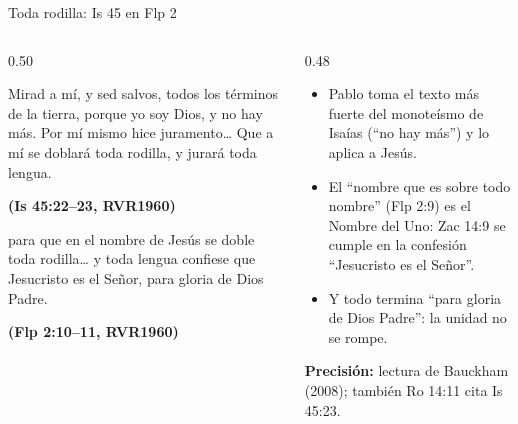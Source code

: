 \documentclass[hyperref={bookmarks=false},aspectratio=169]{beamer}
\newcommand{\fuente}[1]{\par\hfill{\upshape\bfseries\footnotesize\textcolor{azul}{#1}}}
\newcommand{\precision}[1]{{\footnotesize\color{gris}\textbf{Precisión:} #1}}
\begin{document}
\begin{frame}{Toda rodilla: Is 45 en Flp 2}
\begin{columns}[t,onlytextwidth]
\begin{column}{0.50\textwidth}
\begin{cita}[fontupper=\scriptsize\itshape]Mirad a mí, y sed salvos, todos los términos de la tierra, porque yo soy Dios, y no hay más. Por mí mismo hice juramento\ldots{} Que a mí se doblará toda rodilla, y jurará toda lengua.\fuente{(Is 45:22--23, RVR1960)}\end{cita}
\begin{cita}[fontupper=\scriptsize\itshape]para que en el nombre de Jesús se doble toda rodilla\ldots{} y toda lengua confiese que Jesucristo es el Señor, para gloria de Dios Padre.\fuente{(Flp 2:10--11, RVR1960)}\end{cita}
\end{column}
\begin{column}{0.48\textwidth}\small
\begin{itemize}
\item Pablo toma el texto más fuerte del monoteísmo de Isaías (``no hay más'') y lo aplica a Jesús.
\item El ``nombre que es sobre todo nombre'' (Flp 2:9) es el Nombre del Uno: Zac 14:9 se cumple en la confesión ``Jesucristo es el Señor''.
\item Y todo termina ``para gloria de Dios Padre'': la unidad no se rompe.
\end{itemize}
\precision{lectura de Bauckham (2008); también Ro 14:11 cita Is 45:23.}
\end{column}
\end{columns}
\end{frame}
\end{document}
